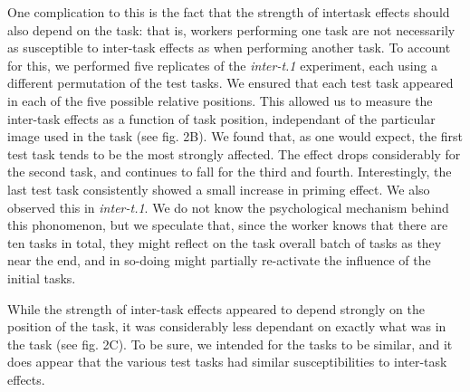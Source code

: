 \documentclass[12pt]{article}
\begin{document}
One complication to this is the fact that the strength of intertask effects
should also depend on the task: that is, workers performing one task are not
necessarily as susceptible to inter-task effects as when performing another 
task.  To account for this, we performed five replicates of the 
\textit{inter-t.1} experiment, each using a different permutation of the 
test tasks.  We ensured that each test task appeared in each of the 
five possible relative positions.  This allowed us to measure the inter-task
effects as a function of task position, independant of the particular image
used in the task (see fig. 2B).  We found that, as one would expect,
the first test task tends to be the most strongly affected.  The effect drops
considerably for the second task, and continues to fall for the third and 
fourth.  Interestingly, the last test task consistently showed a small increase
in priming effect.  We also observed this in \textit{inter-t.1}. 
We do not know the psychological mechanism behind this phonomenon, but we 
speculate that, since the worker knows that there are ten tasks in total,
they might reflect on the task overall batch of tasks as they near the end,
and in so-doing might partially re-activate the influence of the initial tasks.

While the strength of inter-task effects appeared to depend strongly on
the position of the task, it was considerably less dependant on exactly what
was in the task (see fig. 2C).  To be sure, we intended for the tasks to be 
similar, and it does appear that the various test tasks had similar 
susceptibilities to inter-task effects.
\end{document}
